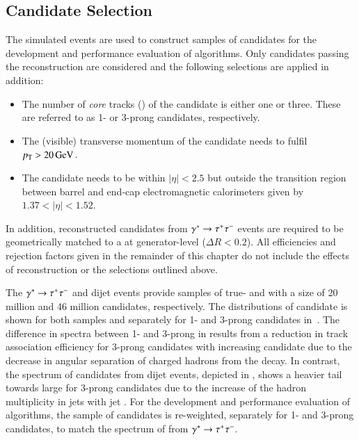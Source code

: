 \subsection{\tauhadvis Candidate Selection}
\label{sec:tauid_candidate_selection}

The simulated events are used to construct samples of \tauhadvis candidates for
the development and performance evaluation of \tauid algorithms. Only candidates
passing the \tauhadvis reconstruction are considered and the following
selections are applied in addition:
\begin{itemize}

\item The number of \emph{core} tracks (\Ntracks) of the \tauhadvis candidate is
  either one or three. These are referred to as 1- or 3-prong \tauhadvis
  candidates, respectively.

\item The (visible) transverse momentum of the candidate needs to
  fulfil $\pT > \SI{20}{\GeV}$.

\item The \tauhadvis candidate needs to be within $|\eta| < 2.5$ but
  outside the transition region between barrel and end-cap
  electromagnetic calorimeters given by $1.37 < |\eta| < 1.52$.

\end{itemize}
In addition, reconstructed \tauhadvis candidates from
$\gamma^{*} \to \tau^{+} \tau^{-}$ events are required to be geometrically
matched to a \tauhad at generator-level ($\Delta R < 0.2$).
All efficiencies and rejection factors given in the remainder of this
chapter do not include the effects of \tauhadvis reconstruction or the
selections outlined above.

The $\gamma^{*} \to \tau^{+} \tau^{-}$ and dijet events provide samples of
true- and \faketauhadvis with a size of 20 million and 46 million
candidates, respectively. The distributions of \tauhadvis candidate
\pT is shown for both samples and separately for 1- and 3-prong
candidates in~. The difference in \pT
spectra between 1- and 3-prong \truetauhadvis in
 results from a reduction in
track association efficiency for 3-prong \tauhadvis candidates with
increasing candidate \pT due to the decrease in angular separation of
charged hadrons from the \taulepton decay. In contrast, the \pT
spectrum of \tauhadvis candidates from dijet events, depicted in
, shows a heavier tail towards
large \pT for 3-prong candidates due to the increase of the hadron
multiplicity in jets with jet \pT. For the development and performance
evaluation of \tauid algorithms, the sample of \faketauhadvis
candidates is re-weighted, separately for 1- and 3-prong candidates,
to match the \pT spectrum of \truetauhadvis from
$\gamma^{*} \to \tau^{+} \tau^{-}$.

